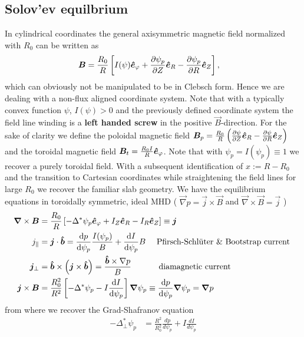 \subsection{Solov'ev equilbrium}\label{sec:solovev}
In cylindrical coordinates the general axisymmetric magnetic field normalized with $R_0$ can be written as
\begin{align}
 {\boldsymbol{B}} &= \frac{R_0}{R}\left[I(\psi) \bm{\hat{e}}_{\varphi} + \frac{\partial
 \psi_p}{\partial Z} \bm{\hat{e}}_R -  \frac{\partial \psi_p}{\partial R} \bm{\hat{e}}_Z\right] ,
\end{align}
which can obviously not be manipulated to be in Clebsch form. Hence we are dealing with a non-flux aligned coordinate system.
Note that with a typically convex function $\psi$, $I(\psi)>0$ and the previously defined coordinate system the field line winding is a {\bf left handed screw} in the positive $\vec B$-direction.
For the sake of clarity we define the poloidal magnetic field \( {\boldsymbol{B}}_p = \frac{R_0}{R}\left( \frac{\partial \psi}{\partial Z}\bm{\hat{e}}_R - \frac{\partial \psi}{\partial R}\bm{\hat{e}}_Z\right)
\) and the toroidal magnetic field \({\boldsymbol{B}}_t =\frac{R_0I}{R} \bm{\hat{e}}_{\varphi}\).
Note that with $\psi_p = I(\psi_p) \equiv 1$ we recover a purely toroidal field.
With a subsequent identification of $x:=R-R_0$ and the transition to
Cartesian coordinates while straightening the field lines for large $R_0$
we recover the familiar slab geometry.
We have
the equilibrium equations in toroidally symmetric, ideal MHD (
$\vec\nabla p = \vec j\times \vec B$ and $\vec \nabla\times\vec B = \vec j$ )
\begin{align}
    {\boldsymbol{\nabla}}\times {\boldsymbol{B}} &= \frac{R_0}{R}\left[ -\Delta^*\psi_p\bm{\hat{e}}_\varphi + I_Z \bm{\hat{e}}_R - I_R\bm{\hat{e}}_Z \right]\equiv {\boldsymbol{j}}\\
 j_\parallel &= {\boldsymbol{j}}\cdot \bm{\hat{b}} = \frac{\mathrm{d} p}{\mathrm{d}\psi_p} \frac{I(\psi_p)}{B} +
 \frac{\mathrm{d} I}{\mathrm{d}\psi_p} B \quad \text{  Pfirsch-Schl\"uter \& Bootstrap current } \\
 {\boldsymbol{j}}_\perp &= \bm{\hat{b}}\times\left({\boldsymbol{j}}\times\bm{\hat{b}}\right)=
 \frac{\bm{\hat{b}} \times \nabla p}{B} \quad\quad\quad \text{ diamagnetic current} \\
 {\boldsymbol{j}}\times{\boldsymbol{B}} &= \frac{R_0^2}{R^2}\left[ -\Delta^* \psi_p - I
     \frac{\mathrm{d} I}{\mathrm{d} \psi_p} \right]{\boldsymbol{\nabla}}\psi_p \equiv \frac{\mathrm{d} p}{\mathrm{d}\psi_p}{\boldsymbol{\nabla}}\psi_p ={\boldsymbol{\nabla}} p
\end{align}
from where we recover the Grad-Shafranov equation
\begin{align}\label{eq:GSEdimless}
 -\Delta^*_\perp  \psi_p &= \frac{R^2}{R_0^2} \frac{d p}{d  \psi_p } + I \frac{d I}{d  \psi_p }
\end{align}
